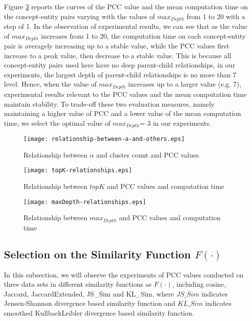 Figure \ref{fig:maxDepth} reports the curves of the PCC value and the mean computation time on the concept-entity pairs varying with the values of $max_{Depth}$ from 1 to 20 with a step of 1. In the observation of experimental results, we can see that as the value of $max_{Depth}$ increases from 1 to 20, the computation time on each concept-entity pair is averagely increasing up to a stable value, while the PCC values first increase to a peak value, then decrease to a stable value. This is because all concept-entity pairs used here have no deep parent-child relationships, in our experiments, the largest depth of parent-child relationships is no more than 7 level. Hence, when the value of $max_{Depth}$ increases up to a larger value (e.g. 7), experimental results relevant to the PCC values and the mean computation time maintain stability. To trade-off these two evaluation measures, namely maintaining a higher value of PCC and a lower value of the mean computation time, we select the optimal value of $max_{Depth} $= 3 in our experiments.

\begin{figure}[!t]
 \centerline{
 \texttt{[image: relationship-between-a-and-others.eps]}}
 \caption{Relationship between $\alpha$ and cluster count and PCC values}
 \label{fig:a}
\end{figure}

\begin{figure}[!t]
 \centerline{
 \texttt{[image: topK-relationships.eps]}}
 \caption{Relationship between $topK$ and PCC values and computation time}
 \label{fig:topK}
\end{figure}

\begin{figure}[!t]
 \centerline{
 \texttt{[image: maxDepth-relationships.eps]}}
 \caption{Relationship between $max_{Depth}$ and PCC values and computation time}
 \label{fig:maxDepth}
\end{figure}

\subsection{Selection on the Similarity Function $F(\cdot)$}
In this subsection, we will observe the experiments of PCC values conducted on three data sets in different similarity functions as $F(\cdot)$, including cosine, Jaccard, JaccardExtended, JS\_Sim and KL\_Sim, where $JS\_Sim$ indicates Jensen-Shannon divergence based similarity function and $KL\_Sim$ indicates smoothed Kullback\-Leibler divergence based similarity function.

